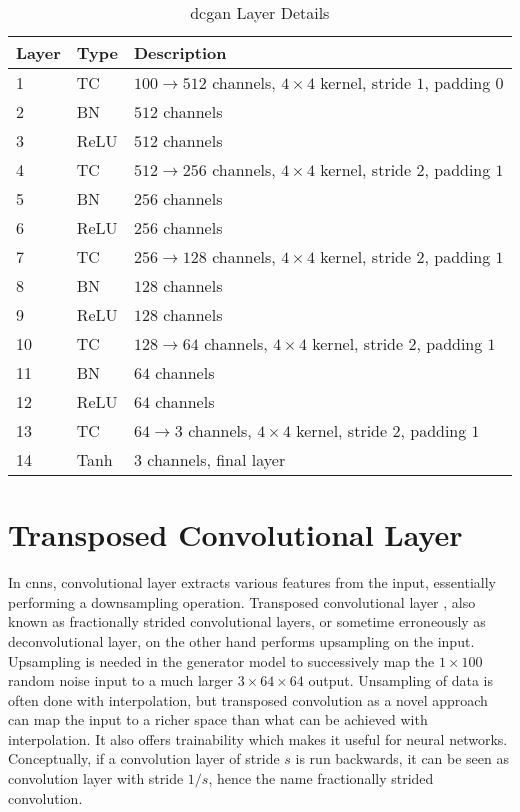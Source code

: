 \begin{table}[h]
  \centering
  \caption{\gls{dcgan} Layer Details}
  \begin{tabular}{l | l | l }
    \toprule
    Layer & Type & Description \\
    \midrule
    1 & TC & $100 \rightarrow 512$ channels, $4 \times 4$ kernel, stride $1$, padding $0$ \\
    2 & BN & $512$ channels\\
    3 & ReLU & $512$ channels \\
    4 & TC & $512 \rightarrow 256$ channels, $4 \times 4$ kernel, stride $2$, padding $1$ \\
    5 & BN & $256$ channels \\
    6 & ReLU & $256$ channels \\
    7 & TC & $256 \rightarrow 128$ channels, $4 \times 4$ kernel, stride $2$, padding $1$ \\
    8 & BN & $128$ channels \\
    9 & ReLU & $128$ channels \\
    10 & TC & $128 \rightarrow 64$ channels, $4 \times 4$ kernel, stride $2$, padding $1$ \\
    11 & BN & $64$ channels \\
    12 & ReLU & $64$ channels \\
    13 & TC & $64 \rightarrow 3$ channels, $4 \times 4$ kernel, stride $2$, padding $1$ \\
    14 & Tanh & 3 channels, final layer \\
    \bottomrule
  \end{tabular}
  \label{table:network_layers}
\end{table}

\section{Transposed Convolutional Layer}

In \gls{cnn}s, convolutional layer extracts various features from the input, essentially performing a
downsampling operation. Transposed convolutional layer \cite{transposed_convolution}, also known as
fractionally strided convolutional layers, or sometime erroneously as deconvolutional layer, on the other
hand performs upsampling on the input.  Upsampling is needed in the generator model to successively map the
$1 \times 100$ random noise input to a much larger $3 \times 64 \times 64$ output. Unsampling of data is often
done with interpolation, but transposed convolution as a novel approach can map the input to a richer space
than what can be achieved with interpolation. It also offers trainability which makes it useful for neural
networks. Conceptually, if a convolution layer of stride $s$ is run backwards, it can be seen as convolution
layer with stride $1/s$, hence the name fractionally strided convolution.

